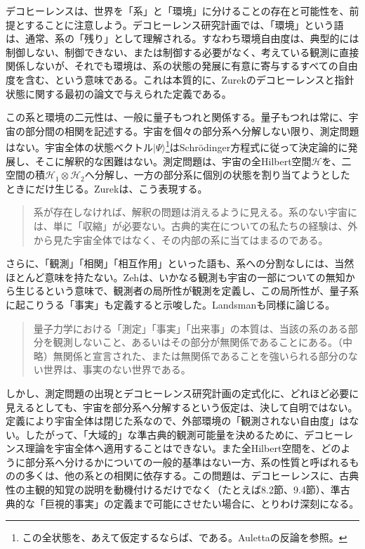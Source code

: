 

デコヒーレンスは、世界を「系」と「環境」に分けることの存在と可能性を、前提とすることに注意しよう。デコヒーレンス研究計画では、「環境」という語は、通常、系の「残り」として理解される。すなわち環境自由度は、典型的には制御しない、制御できない、または制御する必要がなく、考えている観測に直接関係しないが、それでも環境は、系の状態の発展に有意に寄与するすべての自由度を含む、という意味である。これは本質的に、Zurekのデコヒーレンスと指針状態に関する最初の論文\cite[p.~1520]{ref008}で与えられた定義である。

\hypertarget{srcpage:102}{}\label{srcpage:102}
この系と環境の二元性は、一般に量子もつれと関係する。量子もつれは常に、宇宙の部分間の相関を記述する。宇宙を個々の部分系へ分解しない限り、測定問題はない。宇宙全体の状態ベクトル$\lvert\Psi\rangle$\footnote{この全状態を、あえて仮定するならば、である。Aulettaの反論\cite{ref138}を参照。}はSchrödinger方程式に従って決定論的に発展し、そこに解釈的な困難はない。測定問題は、宇宙の全Hilbert空間$\mathcal H$を、二空間の積$\mathcal H_1\otimes\mathcal H_2$へ分解し、一方の部分系に個別の状態を割り当てようとしたときにだけ生じる。Zurek\cite[p.~718]{ref016}は、こう表現する。
\begin{quote}
系が存在しなければ、解釈の問題は消えるように見える。系のない宇宙には、単に「収縮」が必要ない。古典的実在についての私たちの経験は、外から見た宇宙全体ではなく、その内部の系に当てはまるのである。
\end{quote}
さらに、「観測」「相関」「相互作用」といった語も、系への分割なしには、当然ほとんど意味を持たない。Zehは、いかなる観測も宇宙の一部についての無知から生じるという意味で、観測者の局所性が観測を定義し、この局所性が、量子系に起こりうる「事実」も定義すると示唆した。Landsman\cite[pp.~45--46]{ref139}も同様に論じる。
\begin{quote}
量子力学における「測定」「事実」「出来事」の本質は、当該の系のある部分を観測しないこと、あるいはその部分が無関係であることにある。（中略）無関係と宣言された、または無関係であることを強いられる部分のない世界は、事実のない世界である。
\end{quote}
しかし、測定問題の出現とデコヒーレンス研究計画の定式化に、どれほど必要に見えるとしても、宇宙を部分系へ分解するという仮定は、決して自明ではない。定義により宇宙全体は閉じた系なので、外部環境の「観測されない自由度」はない。したがって、「大域的」な準古典的観測可能量を決めるために、デコヒーレンス理論を宇宙全体へ適用することはできない。また全Hilbert空間を、どのように部分系へ分けるかについての一般的基準はない一方、系の性質と呼ばれるものの多くは、他の系との相関に依存する。この問題は、デコヒーレンスに、古典性の主観的知覚の説明を動機付けるだけでなく（たとえば8.2節、9.4節）、準古典的な「巨視的事実」の定義まで可能にさせたい場合に、とりわけ深刻になる。

